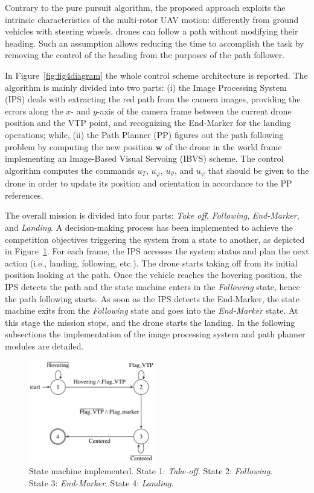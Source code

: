 \documentclass[a4paper,twocolumn,10pt]{article}
\begin{document}
    Contrary to the pure pursuit algorithm, the proposed approach exploits the intrinsic 
    characteristics of the multi-rotor UAV motion: differently from ground vehicles with steering 
    wheels, drones can follow a path without modifying their heading. Such an assumption allows 
    reducing the time to accomplish the task by removing the control of the heading from the purposes 
    of the path follower.

    In Figure~\ref{fig:fig4diagram} the whole control scheme architecture is reported. The algorithm is mainly divided into two parts: (i) the Image Processing System (IPS) deals with extracting the red path from the 
    camera images, providing the errors along the $x$- and $y$-axis of the camera frame between the current drone position and the VTP point, and recognizing the End-Marker for the landing operations; while, (ii) the Path Planner (PP) figures out the path following problem by computing the new 
    position $\mathbf{w}$ of the drone in the world frame\cite[Sec.~V]{SilanoMATFly} implementing 
    an Image-Based Visual Servoing (IBVS) scheme. The control algorithm computes the commands $u_T$, $u_\varphi$, $u_\vartheta$, and $u_\psi$ that should be given to the drone in order to update its position and orientation in accordance to the PP references. 

    The overall mission is divided into four parts: \textit{Take off}, \textit{Following}, \textit{End-Marker}, and \textit{Landing}. A decision-making process has been implemented to  achieve the competition objectives triggering the system from a state to another, as depicted in 
    Figure~\ref{fig:fig5stateMachine}. For each frame, the IPS accesses the system status and plan the next action (i.e., landing, following, etc.). The drone starts taking off from its initial position looking at the path. Once the vehicle reaches the hovering position, the IPS detects the path and the state machine enters in the \textit{Following} state, hence the path following starts. As soon as the IPS detects the End-Marker, the state machine exits from the \textit{Following} state and goes into the \textit{End-Marker} state. At this stage the mission stops, and the drone starts the landing. In the following subsections the implementation of the image processing system and path planner modules are detailed.

    \begin{figure}
        \centering
        \includegraphics[width=0.49\textwidth]{pics/fig5_lines.png}
        \caption{State machine implemented. State 1: \textit{Take-off}. State 2: \textit{Following}. State 3: \textit{End-Marker}. State 4: \textit{Landing}.} 
        \label{fig:fig5stateMachine}
    \end{figure} 
\end{document}
